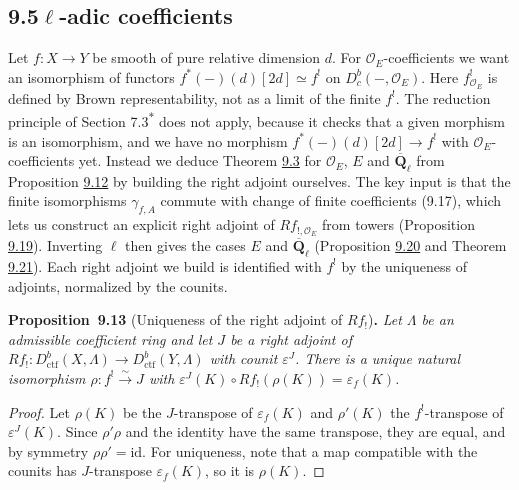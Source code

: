 \documentclass[11pt]{article}
\newenvironment{bpstatement}[2]{\par\addvspace{0.6\baselineskip}\noindent\textbf{#1}#2\textbf{.}\enspace\ignorespaces}
  {\par\addvspace{0.4\baselineskip}}
\newenvironment{bpstatementit}[2]{\begin{bpstatement}{#1}{#2}\itshape\ignorespaces}{\end{bpstatement}}
\newcommand{\bpout}[1]{#1\textsuperscript{\hyperlink{bp-outside}{\ensuremath{\ast}}}}
\providecommand{\Dbc}{}\renewcommand{\Dbc}{D^b_c}
\begin{document}
\subsection*{\texorpdfstring{9.5\quad $\ell$-adic coefficients}{9.5 ell-adic coefficients}}
\label{bp41}%
\label{bp42}%
Let \(f:X\to Y\) be smooth of pure relative dimension \(d\). For \(\mathcal O_E\)-coefficients we want an isomorphism of functors \(f^*(-)(d)[2d]\simeq f^!\) on \(\Dbc(-,\mathcal O_E)\). Here \(f^!_{\mathcal O_E}\) is defined by Brown representability, not as a limit of the finite \(f^!\). The reduction principle of Section \bpout{7.3} does not apply, because it checks that a given morphism is an isomorphism, and we have no morphism \(f^*(-)(d)[2d]\to f^!\) with \(\mathcal O_E\)-coefficients yet. Instead we deduce Theorem \hyperref[bp11]{9.3} for \(\mathcal O_E\), \(E\) and \(\overline{\mathbf Q}_\ell\) from Proposition \hyperref[bp39]{9.12} by building the right adjoint ourselves. The key input is that the finite isomorphisms \(\gamma_{f,A}\) commute with change of finite coefficients (9.17), which lets us construct an explicit right adjoint of \(Rf_{!,\mathcal O_E}\) from towers (Proposition \hyperref[bp63]{9.19}). Inverting \(\ell\) then gives the cases \(E\) and \(\overline{\mathbf Q}_\ell\) (Proposition \hyperref[bp68]{9.20} and Theorem \hyperref[bp71]{9.21}). Each right adjoint we build is identified with \(f^!\) by the uniqueness of adjoints, normalized by the counits.

\label{bp43}%
\begin{bpstatementit}{Proposition~9.13}{ (Uniqueness of the right adjoint of $Rf_!$)}
Let \(\Lambda\) be an admissible coefficient ring and let \(J\) be a right adjoint of \(Rf_!:D^b_{\mathrm{ctf}}(X,\Lambda)\to D^b_{\mathrm{ctf}}(Y,\Lambda)\) with counit \(\varepsilon^J\). There is a unique natural isomorphism \(\rho:f^!\xrightarrow{\sim}J\) with \(\varepsilon^J(K)\circ Rf_!(\rho(K))=\varepsilon_f(K)\).
\end{bpstatementit}

\begin{proof}[{Proof}]\label{bp44}%
Let \(\rho(K)\) be the \(J\)-transpose of \(\varepsilon_f(K)\) and \(\rho'(K)\) the \(f^!\)-transpose of \(\varepsilon^J(K)\). Since \(\rho'\rho\) and the identity have the same transpose, they are equal, and by symmetry \(\rho\rho'=\mathrm{id}\). For uniqueness, note that a map compatible with the counits has \(J\)-transpose \(\varepsilon_f(K)\), so it is \(\rho(K)\).
\end{proof}
\end{document}
